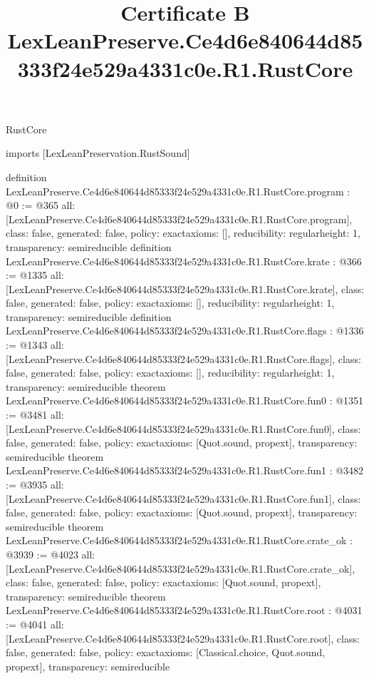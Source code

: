 \begin{lexlean}{RustCore}
\title{Certificate B LexLeanPreserve.Ce4d6e840644d85333f24e529a4331c0e.R1.RustCore}
\begin{coremodule}
imports [LexLeanPreservation.RustSound]

definition LexLeanPreserve.Ce4d6e840644d85333f24e529a4331c0e.R1.RustCore.program : @0 := @365 {
  all: [LexLeanPreserve.Ce4d6e840644d85333f24e529a4331c0e.R1.RustCore.program],
  class: false,
  generated: false,
  policy: exact{axioms: []},
  reducibility: regular{height: 1},
  transparency: semireducible
}
definition LexLeanPreserve.Ce4d6e840644d85333f24e529a4331c0e.R1.RustCore.krate : @366 := @1335 {
  all: [LexLeanPreserve.Ce4d6e840644d85333f24e529a4331c0e.R1.RustCore.krate],
  class: false,
  generated: false,
  policy: exact{axioms: []},
  reducibility: regular{height: 1},
  transparency: semireducible
}
definition LexLeanPreserve.Ce4d6e840644d85333f24e529a4331c0e.R1.RustCore.flags : @1336 := @1343 {
  all: [LexLeanPreserve.Ce4d6e840644d85333f24e529a4331c0e.R1.RustCore.flags],
  class: false,
  generated: false,
  policy: exact{axioms: []},
  reducibility: regular{height: 1},
  transparency: semireducible
}
theorem LexLeanPreserve.Ce4d6e840644d85333f24e529a4331c0e.R1.RustCore.fun0 : @1351 := @3481 {
  all: [LexLeanPreserve.Ce4d6e840644d85333f24e529a4331c0e.R1.RustCore.fun0],
  class: false,
  generated: false,
  policy: exact{axioms: [Quot.sound, propext]},
  transparency: semireducible
}
theorem LexLeanPreserve.Ce4d6e840644d85333f24e529a4331c0e.R1.RustCore.fun1 : @3482 := @3935 {
  all: [LexLeanPreserve.Ce4d6e840644d85333f24e529a4331c0e.R1.RustCore.fun1],
  class: false,
  generated: false,
  policy: exact{axioms: [Quot.sound, propext]},
  transparency: semireducible
}
theorem LexLeanPreserve.Ce4d6e840644d85333f24e529a4331c0e.R1.RustCore.crate_ok : @3939 := @4023 {
  all: [LexLeanPreserve.Ce4d6e840644d85333f24e529a4331c0e.R1.RustCore.crate_ok],
  class: false,
  generated: false,
  policy: exact{axioms: [Quot.sound, propext]},
  transparency: semireducible
}
theorem LexLeanPreserve.Ce4d6e840644d85333f24e529a4331c0e.R1.RustCore.root : @4031 := @4041 {
  all: [LexLeanPreserve.Ce4d6e840644d85333f24e529a4331c0e.R1.RustCore.root],
  class: false,
  generated: false,
  policy: exact{axioms: [Classical.choice, Quot.sound, propext]},
  transparency: semireducible
}


\end{coremodule}
\end{lexlean}
